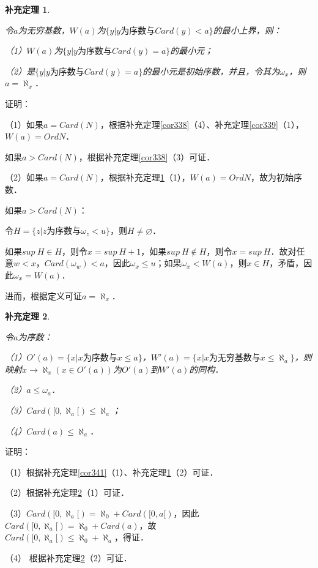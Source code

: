 \documentclass[12pt, a4paper, oneside]{book}
\newtheorem{cor}{补充定理}
\begin{document}
			\begin{cor}\label{cor343}
				\hfill\par
				令$a$为无穷基数，$W(a)$为$\{y|y\text{为序数}\text{与}Card(y)<a\}$的最小上界，则：
				\par
				（1）$W(a)$为$\{y|y\text{为序数}\text{与}Card(y)=a\}$的最小元；
				\par
				（2）是$\{y|y\text{为序数}\text{与}Card(y)=a\}$的最小元是初始序数，并且，令其为$\omega_x$，则$a=\aleph_x$．
			\end{cor}
			证明：
			\par
			（1）如果$a=Card(N)$，根据补充定理\ref{cor338}（4）、补充定理\ref{cor339}（1），$W(a)=Ord{N}$．
			\par
			如果$a>Card(N)$，根据补充定理\ref{cor338}（3）可证．
			\par
			（2）如果$a=Card(N)$，根据补充定理\ref{cor343}（1），$W(a)=Ord{N}$，故为初始序数．
			\par
			如果$a>Card(N)$：
			\par
			令$H=\{z|z\text{为序数}\text{与}\omega_z<u\}$，则$H\neq \varnothing$．
			\par
			如果$sup\ H\in H$，则令$x=sup\ H+1$，如果$sup\ H\notin H$，则令$x=sup\ H$．故对任意$w<x$，$Card(\omega_w)<a$，因此$\omega_x\leq u$；如果$\omega_x<W(a)$，则$x\in H$，矛盾，因此$\omega_x=W(a)$．
			\par
			进而，根据定义可证$a=\aleph_x$．
					
			\begin{cor}\label{cor344}
				\hfill\par
				令$a$为序数：
				\par
				（1）$O'(a)=\{x|x\text{为序数}\text{与}x\leq a\}$，$W'(a)=\{x|x\text{为无穷基数}\text{与}x\leq \aleph_a\}$，则映射$x\to \aleph_x(x\in O'(a))$为$O'(a)$到$W'(a)$的同构．
				\par
				（2）$a\leq \omega_a$．
				\par
				（3）$Card([0, \aleph_a[)\leq \aleph_a$；
				\par
				（4）$Card(a)\leq \aleph_a$．
			\end{cor}
			证明：
			\par
			（1）根据补充定理\ref{cor341}（1）、补充定理\ref{cor343}（2）可证．
			\par
			（2）根据补充定理\ref{cor344}（1）可证．
			\par
			（3）$Card([0, \aleph_a[)=\aleph_0+Card([0, a[)$，因此$Card([0, \aleph_a[)=\aleph_0+Card(a)$，故\\$Card([0, \aleph_a[)\leq \aleph_0+\aleph_a$，得证．
			\par
			（4）	根据补充定理\ref{cor344}（2）可证．
			
\end{document}
